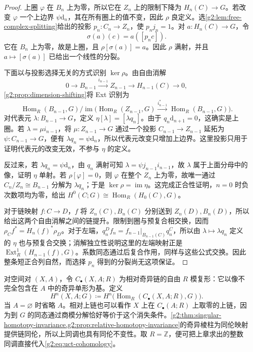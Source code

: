 \begin{proof}
	上圈 \(\varphi\) 在 \(B_n\) 上为零，所以它在 \(Z_n\) 上的限制下降为 \(H_n(C)\to G\)。若改变 \(\varphi\) 一个上边界 \(\psi\mathrm{d}_n\)，其在所有圈上的值不变，因此 \(\rho\) 良定义。选\cref{g2:lem:free-complex-splitting}给出的投影 \(p_n:C_n\to Z_n\)，使 \(p_nj_n=1\)。对 \(a:H_n(C)\to G\)，令
	\[
		\sigma(a)(c)=a([p_nc]).
	\]
	它在 \(B_n\) 上为零，故是上圈，且 \(\rho[\sigma(a)]=a\)。因此 \(\rho\) 满射，并且 \(a\mapsto[\sigma(a)]\) 已给出一个线性的分裂。

	下面以与投影选择无关的方式识别 \(\ker\rho\)。由自由消解
	\[
		0\longrightarrow B_{n-1}\xrightarrow{i_{n-1}}Z_{n-1}\longrightarrow H_{n-1}(C)\longrightarrow0,
	\]
	\cref{g2:prop:dimension-shifting}将 Ext 识别为
	\[
		\operatorname{Hom}_R(B_{n-1},G)\big/\operatorname{im}\bigl(\operatorname{Hom}_R(Z_{n-1},G)\xrightarrow{i_{n-1}^*}\operatorname{Hom}_R(B_{n-1},G)\bigr).
	\]
	对代表元 \(\lambda:B_{n-1}\to G\)，定义 \(\eta[\lambda]=[\lambda q_n]\)。由于 \(q_n\mathrm{d}_{n+1}=0\)，这确实是上圈。若 \(\lambda=\mu i_{n-1}\)，将 \(\mu:Z_{n-1}\to G\) 通过一个投影 \(C_{n-1}\to Z_{n-1}\) 延拓为 \(\psi:C_{n-1}\to G\)，便有 \(\lambda q_n=\psi\mathrm{d}_n\)，所以代表元改变只增加上边界。这里投影只用于证明代表元的改变无效，不参与 \(\eta\) 的定义。

	反过来，若 \(\lambda q_n=\psi\mathrm{d}_n\)，由 \(q_n\) 满射可知 \(\lambda=\psi j_{n-1}i_{n-1}\)，故 \(\lambda\) 属于上面分母中的像，证明 \(\eta\) 单射。若 \(\rho[\varphi]=0\)，则 \(\varphi\) 在整个 \(Z_n\) 上为零，故唯一通过 \(C_n/Z_n\cong B_{n-1}\) 分解为 \(\lambda q_n\)；于是 \(\ker\rho=\operatorname{im}\eta\)。这完成正合性证明，\(n=0\) 时负次数项均为零，给出 \(H^0(C;G)\cong\operatorname{Hom}_R(H_0(C),G)\)。

	对于链映射 \(f:C\to D\)，\(f\) 将 \(Z_n(C),B_n(C)\) 分别送到 \(Z_n(D),B_n(D)\)，所以给出这两个自由消解之间的链提升。限制到圈与预复合相交换，因而 \(\rho_Cf^*=H_n(f)^*\rho_D\)。对于左端，\(q_n^D f_n=f_{n-1}|_{B_{n-1}(C)}q_n^C\)，所以由 \(\lambda\mapsto\lambda q_n\) 定义的 \(\eta\) 也与预复合交换；消解独立性说明这里的左端映射正是 \(\operatorname{Ext}_R^1(H_{n-1}(f),G)\)。系数同态通过后复合作用，同样与这些公式交换。因此整条短正合列自然，而选择 \(p_n\) 得到的分裂尚无这项保证。
\end{proof}

对空间对 \((X,A)\)，令 \(C_\bullet(X,A;R)\) 为相对奇异链的自由 \(R\) 模复形：它以像不完全包含在 \(A\) 中的奇异单形为基。定义
\[
	H^n(X,A;G)\coloneqq H^n\bigl(\operatorname{Hom}_R(C_\bullet(X,A;R),G)\bigr).
\]
当 \(A=\varnothing\) 时省略 \(A\)。相对上链也可以看作 \(X\) 上在 \(C_\bullet(A;R)\) 上取零的上链，因为到 \(G\) 的同态通过商模分解恰好等价于这个消失条件。\cref{g2:thm:singular-homotopy-invariance,g2:prop:relative-homotopy-invariance}的奇异棱柱为同伦映射提供链同伦，所以上同调也具有同伦不变性。取 \(R=\mathbb Z\)，便可把上章求出的整数同调直接代入\eqref{g2:eq:uct-cohomology}。

